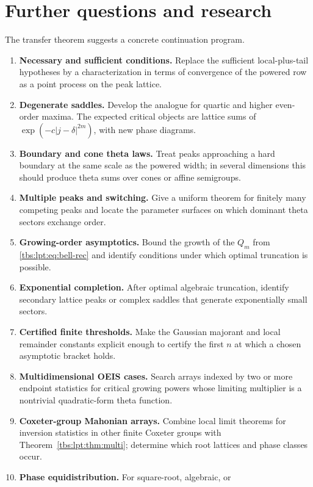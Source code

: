 \documentclass[11pt,a4paper]{article}
\numberwithin{equation}{section}
\theoremstyle{definition}
\begin{document}
\section{Further questions and research}\label{tbs:lpt:sec:questions}

The transfer theorem suggests a concrete continuation program.
\begin{enumerate}[label=\textbf{R\arabic*.},leftmargin=*]
\item \textbf{Necessary and sufficient conditions.} Replace the
sufficient local-plus-tail hypotheses by a characterization in terms of
convergence of the powered row as a point process on the peak lattice.
\item \textbf{Degenerate saddles.} Develop the analogue for quartic and
higher even-order maxima. The expected critical objects are lattice sums
of $\exp(-c|j-\delta|^{2m})$, with new phase diagrams.
\item \textbf{Boundary and cone theta laws.} Treat peaks approaching a
hard boundary at the same scale as the powered width; in several
dimensions this should produce theta sums over cones or affine
semigroups.
\item \textbf{Multiple peaks and switching.} Give a uniform theorem for
finitely many competing peaks and locate the parameter surfaces on which
dominant theta sectors exchange order.
\item \textbf{Growing-order asymptotics.} Bound the growth of the $Q_m$
from \eqref{tbs:lpt:eq:bell-rec} and identify conditions under which
optimal truncation is possible.
\item \textbf{Exponential completion.} After optimal algebraic truncation,
identify secondary lattice peaks or complex saddles that generate
exponentially small sectors.
\item \textbf{Certified finite thresholds.} Make the Gaussian majorant
and local remainder constants explicit enough to certify the first $n$ at
which a chosen asymptotic bracket holds.
\item \textbf{Multidimensional OEIS cases.} Search arrays indexed by two
or more endpoint statistics for critical growing powers whose limiting
multiplier is a nontrivial quadratic-form theta function.
\item \textbf{Coxeter-group Mahonian arrays.} Combine local limit
theorems for inversion statistics in other finite Coxeter groups with
Theorem~\ref{tbs:lpt:thm:multi}; determine which root lattices and phase
classes occur.
\item \textbf{Phase equidistribution.} For square-root, algebraic, or

\end{enumerate}
\end{document}
